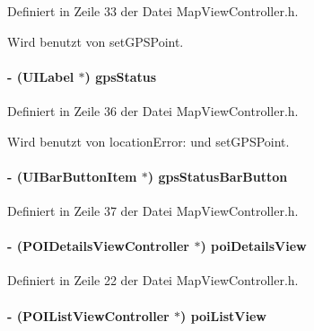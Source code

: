 Definiert in Zeile 33 der Datei MapViewController.h.

Wird benutzt von setGPSPoint.\hypertarget{interface_map_view_controller_ad0402524f486125ee10dff142c7b3ffd}{
\paragraph[{gpsStatus}]{\setlength{\rightskip}{0pt plus 5cm}-\/ (UILabel $\ast$) gpsStatus}\hfill}
\label{interface_map_view_controller_ad0402524f486125ee10dff142c7b3ffd}


Definiert in Zeile 36 der Datei MapViewController.h.

Wird benutzt von locationError: und setGPSPoint.\hypertarget{interface_map_view_controller_a64d3497885159ef092e213a71a5a7e42}{
\paragraph[{gpsStatusBarButton}]{\setlength{\rightskip}{0pt plus 5cm}-\/ (UIBarButtonItem $\ast$) gpsStatusBarButton}\hfill}
\label{interface_map_view_controller_a64d3497885159ef092e213a71a5a7e42}


Definiert in Zeile 37 der Datei MapViewController.h.\hypertarget{interface_map_view_controller_a306718a79bf2bf4553b90226aad82a1a}{
\paragraph[{poiDetailsView}]{\setlength{\rightskip}{0pt plus 5cm}-\/ ({\bf POIDetailsViewController} $\ast$) poiDetailsView}\hfill}
\label{interface_map_view_controller_a306718a79bf2bf4553b90226aad82a1a}


Definiert in Zeile 22 der Datei MapViewController.h.\hypertarget{interface_map_view_controller_a29e38febc1e20365e2a84a25e84cea30}{
\paragraph[{poiListView}]{\setlength{\rightskip}{0pt plus 5cm}-\/ ({\bf POIListViewController} $\ast$) poiListView}\hfill}
\label{interface_map_view_controller_a29e38febc1e20365e2a84a25e84cea30}


